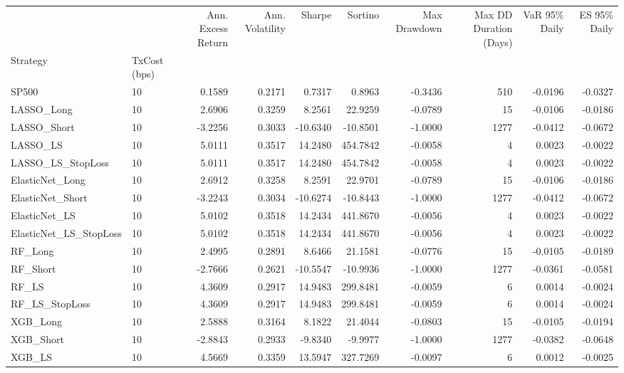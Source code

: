 \begin{tabular}{llrrrrrrrr}
\toprule
 &  & Ann. Excess Return & Ann. Volatility & Sharpe & Sortino & Max Drawdown & Max DD Duration (Days) & VaR 95\% Daily & ES 95\% Daily \\
Strategy & TxCost (bps) &  &  &  &  &  &  &  &  \\
\midrule
SP500 & 10 & 0.1589 & 0.2171 & 0.7317 & 0.8963 & -0.3436 & 510 & -0.0196 & -0.0327 \\
\cline{1-10}
LASSO\_Long & 10 & 2.6906 & 0.3259 & 8.2561 & 22.9259 & -0.0789 & 15 & -0.0106 & -0.0186 \\
\cline{1-10}
LASSO\_Short & 10 & -3.2256 & 0.3033 & -10.6340 & -10.8501 & -1.0000 & 1277 & -0.0412 & -0.0672 \\
\cline{1-10}
LASSO\_LS & 10 & 5.0111 & 0.3517 & 14.2480 & 454.7842 & -0.0058 & 4 & 0.0023 & -0.0022 \\
\cline{1-10}
LASSO\_LS\_StopLoss & 10 & 5.0111 & 0.3517 & 14.2480 & 454.7842 & -0.0058 & 4 & 0.0023 & -0.0022 \\
\cline{1-10}
ElasticNet\_Long & 10 & 2.6912 & 0.3258 & 8.2591 & 22.9701 & -0.0789 & 15 & -0.0106 & -0.0186 \\
\cline{1-10}
ElasticNet\_Short & 10 & -3.2243 & 0.3034 & -10.6274 & -10.8443 & -1.0000 & 1277 & -0.0412 & -0.0672 \\
\cline{1-10}
ElasticNet\_LS & 10 & 5.0102 & 0.3518 & 14.2434 & 441.8670 & -0.0056 & 4 & 0.0023 & -0.0022 \\
\cline{1-10}
ElasticNet\_LS\_StopLoss & 10 & 5.0102 & 0.3518 & 14.2434 & 441.8670 & -0.0056 & 4 & 0.0023 & -0.0022 \\
\cline{1-10}
RF\_Long & 10 & 2.4995 & 0.2891 & 8.6466 & 21.1581 & -0.0776 & 15 & -0.0105 & -0.0189 \\
\cline{1-10}
RF\_Short & 10 & -2.7666 & 0.2621 & -10.5547 & -10.9936 & -1.0000 & 1277 & -0.0361 & -0.0581 \\
\cline{1-10}
RF\_LS & 10 & 4.3609 & 0.2917 & 14.9483 & 299.8481 & -0.0059 & 6 & 0.0014 & -0.0024 \\
\cline{1-10}
RF\_LS\_StopLoss & 10 & 4.3609 & 0.2917 & 14.9483 & 299.8481 & -0.0059 & 6 & 0.0014 & -0.0024 \\
\cline{1-10}
XGB\_Long & 10 & 2.5888 & 0.3164 & 8.1822 & 21.4044 & -0.0803 & 15 & -0.0105 & -0.0194 \\
\cline{1-10}
XGB\_Short & 10 & -2.8843 & 0.2933 & -9.8340 & -9.9977 & -1.0000 & 1277 & -0.0382 & -0.0648 \\
\cline{1-10}
XGB\_LS & 10 & 4.5669 & 0.3359 & 13.5947 & 327.7269 & -0.0097 & 6 & 0.0012 & -0.0025 \\

\end{tabular}
